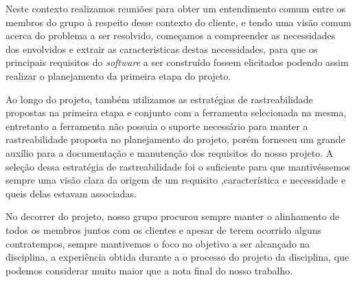 Neste contexto realizamos reuniões para obter um entendimento comum entre os membros do grupo à respeito desse contexto do cliente, e tendo uma visão comum acerca do problema a ser resolvido, começamos a compreender as necessidades dos envolvidos e extrair as caracteristicas destas necessidades, para que os principais requisitos do \textit{software} a ser construído fossem elicitados podendo assim realizar o planejamento da primeira etapa do projeto.

Ao longo do projeto, também utilizamos as estratégias de rastreabilidade propostas na primeira etapa e conjunto com a ferramenta selecionada na mesma, entretanto a ferramenta não possuia o suporte necessário para manter a rastreabilidade proposta no planejamento do projeto, porém forneceu um grande auxílio para a documentação e manutenção dos requisitos do nosso projeto. A seleção dessa estratégia de rastreabilidade foi o suficiente para que mantivéssemos sempre uma visão clara da origem de um requisito ,característica e necessidade e queis delas estavam associadas.

No decorrer do projeto, nosso grupo procurou sempre manter o alinhamento de todos os membros juntos com os clientes e apesar de terem ocorrido alguns contratempos, sempre mantivemos o foco no objetivo a ser alcançado na disciplina, a experiência obtida durante a o processo do projeto da disciplina, que podemos considerar muito maior que a nota final do nosso trabalho.